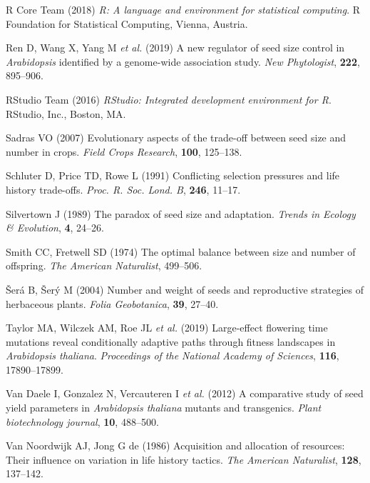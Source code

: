 \documentclass[]{article}
\begin{document}
\leavevmode\hypertarget{ref-RCT2015}{}%
R Core Team (2018) \emph{R: A language and environment for statistical computing}. R Foundation for Statistical Computing, Vienna, Austria.

\leavevmode\hypertarget{ref-ren2019new}{}%
Ren D, Wang X, Yang M \emph{et al.} (2019) A new regulator of seed size control in \emph{Arabidopsis} identified by a genome-wide association study. \emph{New Phytologist}, \textbf{222}, 895--906.

\leavevmode\hypertarget{ref-RStudioTeam2015}{}%
RStudio Team (2016) \emph{RStudio: Integrated development environment for R}. RStudio, Inc., Boston, MA.

\leavevmode\hypertarget{ref-Sadras2007}{}%
Sadras VO (2007) Evolutionary aspects of the trade-off between seed size and number in crops. \emph{Field Crops Research}, \textbf{100}, 125--138.

\leavevmode\hypertarget{ref-schluter1991conflicting}{}%
Schluter D, Price TD, Rowe L (1991) Conflicting selection pressures and life history trade-offs. \emph{Proc. R. Soc. Lond. B}, \textbf{246}, 11--17.

\leavevmode\hypertarget{ref-Silvertown1989}{}%
Silvertown J (1989) The paradox of seed size and adaptation. \emph{Trends in Ecology \& Evolution}, \textbf{4}, 24--26.

\leavevmode\hypertarget{ref-Smith1974}{}%
Smith CC, Fretwell SD (1974) The optimal balance between size and number of offspring. \emph{The American Naturalist}, 499--506.

\leavevmode\hypertarget{ref-Sera2004}{}%
Šerá B, Šerý M (2004) Number and weight of seeds and reproductive strategies of herbaceous plants. \emph{Folia Geobotanica}, \textbf{39}, 27--40.

\leavevmode\hypertarget{ref-taylor2019large}{}%
Taylor MA, Wilczek AM, Roe JL \emph{et al.} (2019) Large-effect flowering time mutations reveal conditionally adaptive paths through fitness landscapes in \emph{Arabidopsis thaliana}. \emph{Proceedings of the National Academy of Sciences}, \textbf{116}, 17890--17899.

\leavevmode\hypertarget{ref-van2012comparative}{}%
Van Daele I, Gonzalez N, Vercauteren I \emph{et al.} (2012) A comparative study of seed yield parameters in \emph{Arabidopsis thaliana} mutants and transgenics. \emph{Plant biotechnology journal}, \textbf{10}, 488--500.

\leavevmode\hypertarget{ref-VanNoordwijk1986}{}%
Van Noordwijk AJ, Jong G de (1986) Acquisition and allocation of resources: Their influence on variation in life history tactics. \emph{The American Naturalist}, \textbf{128}, 137--142.
\end{document}
